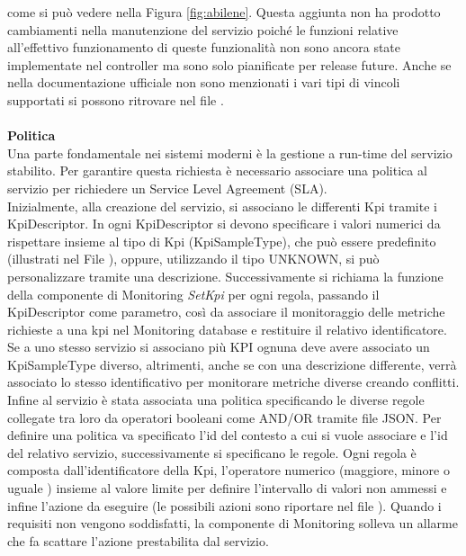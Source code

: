 come si può vedere nella Figura \ref{fig:abilene}.
Questa aggiunta non ha prodotto cambiamenti nella manutenzione del servizio poiché le funzioni relative all'effettivo funzionamento di queste funzionalità non 
sono ancora state implementate nel controller ma sono solo pianificate per release future.
Anche se nella documentazione ufficiale non sono menzionati i vari tipi di vincoli supportati 
si possono ritrovare nel file \cite{vincoli}.
\\
\\\textbf{Politica}
\\Una parte fondamentale nei sistemi moderni è la gestione a run-time del servizio stabilito\cite{demo}.
Per garantire questa richiesta è necessario associare una politica al servizio per richiedere un Service Level Agreement (SLA).
\\Inizialmente, alla creazione del servizio, si associano le differenti Kpi tramite i KpiDescriptor.
In ogni KpiDescriptor  si devono specificare i valori numerici da rispettare insieme al tipo di Kpi (KpiSampleType), che può essere predefinito (illustrati nel File \cite{kpi}),
oppure, utilizzando il tipo UNKNOWN, si può personalizzare tramite una descrizione.
Successivamente si richiama la funzione della componente di Monitoring \textit{SetKpi} per ogni regola, passando il KpiDescriptor come parametro, così da
associare il monitoraggio delle metriche richieste a una kpi nel Monitoring database e restituire il relativo identificatore.
Se a uno stesso servizio si associano più KPI ognuna deve avere associato un KpiSampleType diverso, altrimenti, anche se con una descrizione differente,
verrà associato lo stesso identificativo per monitorare metriche diverse creando conflitti. 
Infine al servizio è stata associata una politica specificando le diverse regole collegate tra loro da operatori booleani come AND/OR tramite file JSON.
Per definire una politica va specificato l'id del contesto a cui si vuole associare e l'id del relativo servizio, successivamente si specificano le regole.
Ogni regola è composta dall'identificatore della Kpi, l'operatore numerico (maggiore, minore o uguale \cite{op}) insieme al valore limite 
per definire l'intervallo di valori non ammessi e infine l'azione da eseguire (le possibili azioni sono riportare nel file \cite{az}).
Quando i requisiti non vengono soddisfatti, la componente di Monitoring solleva un allarme che fa scattare l'azione prestabilita dal servizio.

